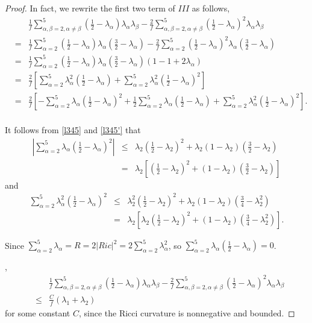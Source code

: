 \documentclass[12pt]{amsart}
\newcommand{\ban}{\begin{eqnarray*}}
\newcommand{\ean}{\end{eqnarray*}}
\begin{document}
\begin{proof}
		In fact, we rewrite the first two term of $III$ as follows,
		\ban
		&&\frac{1}{f}\sum_{\alpha,\beta=2,\alpha\neq\beta}^5({\frac{1}{2}}-\lambda_{\alpha})\lambda_\alpha\lambda_\beta
		-\frac{2}{f}\sum_{\alpha,\beta=2,\alpha\neq\beta}^5({\frac{1}{2}}-\lambda_{\alpha})^2\lambda_\alpha\lambda_\beta\\
		&=&\frac{1}{f}\sum_{\alpha=2}^5({\frac{1}{2}}-\lambda_{\alpha})\lambda_\alpha(\frac{3}{2}-\lambda_\alpha)
		-\frac{2}{f}\sum_{\alpha=2}^5({\frac{1}{2}}-\lambda_{\alpha})^2\lambda_\alpha(\frac{3}{2}-\lambda_\alpha)\\
		&=&\frac{1}{f}\sum_{\alpha=2}^5({\frac{1}{2}}-\lambda_{\alpha})\lambda_\alpha(\frac{3}{2}-\lambda_\alpha)(1-1+2\lambda_{\alpha})\\
		&=&\frac{2}{f}\left[\sum_{\alpha=2}^5\lambda_\alpha^2({\frac{1}{2}}-\lambda_{\alpha})+
		\sum_{\alpha=2}^5\lambda_\alpha^2({\frac{1}{2}}-\lambda_{\alpha})^2\right]\\
		&=&\frac{2}{f}\left[-\sum_{\alpha=2}^5\lambda_\alpha({\frac{1}{2}}-\lambda_{\alpha})^2+
		\frac{1}{2}\sum_{\alpha=2}^5\lambda_\alpha({\frac{1}{2}}-\lambda_{\alpha})
		+\sum_{\alpha=2}^5\lambda_\alpha^2({\frac{1}{2}}-\lambda_{\alpha})^2\right].\\
		\ean
		

 It follows from \eqref{l345} and \eqref{l345'} that
		\ban
		|\sum_{\alpha=2}^5\lambda_\alpha({\frac{1}{2}}-\lambda_{\alpha})^2|
		&\leq&\lambda_2({\frac{1}{2}}-\lambda_2)^2+\lambda_2(1-\lambda_2)(\frac{3}{2}-\lambda_2)\\
		&=&\lambda_2\left[ ({\frac{1}{2}}-\lambda_2)^2+(1-\lambda_2)(\frac{3}{2}-\lambda_2)\right]
		\ean
		and
		\ban
		\sum_{\alpha=2}^5\lambda_\alpha^2({\frac{1}{2}}-\lambda_{\alpha})^2
		&\leq&\lambda_2^2({\frac{1}{2}}-\lambda_2)^2+\lambda_2(1-\lambda_2)(\frac{3}{4}-\lambda_2^2)\\
		&=&\lambda_2\left[\lambda_2({\frac{1}{2}}-\lambda_2)^2+(1-\lambda_2)(\frac{3}{4}-\lambda_2^2)\right].
		\ean

Since $\sum_{\alpha=2}^5\lambda_\alpha=R=2|Ric|^2=2\sum_{\alpha=2}^5\lambda_\alpha^2$, so $\sum_{\alpha=2}^5\lambda_\alpha({\frac{1}{2}}-\lambda_{\alpha})=0$.


	,
		\ban
		&&\frac{1}{f}\sum_{\alpha,\beta=2,\alpha\neq\beta}^5({\frac{1}{2}}-\lambda_{\alpha})\lambda_\alpha\lambda_\beta
		-\frac{2}{f}\sum_{\alpha,\beta=2,\alpha\neq\beta}^5({\frac{1}{2}}-\lambda_{\alpha})^2\lambda_\alpha\lambda_\beta\\
		&\leq& \frac{C}{f}(\lambda_{1}+\lambda_{2})
		\ean
		for some constant $C$, since the Ricci curvature is nonnegative and bounded.
		

\end{proof}
\end{document}
